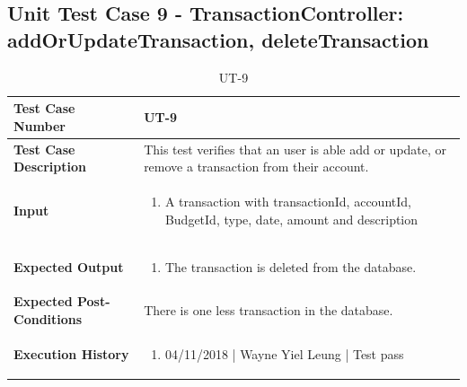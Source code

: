 \documentclass[12pt]{article}
\begin{document}
\subsection{Unit Test Case 9 - TransactionController: addOrUpdateTransaction, deleteTransaction}
\def\arraystretch{1.5}%
\begin{table}[htbp]
\centering
\caption{UT-9}
\label{UT-9}
\begin{tabularx}{\textwidth}{ | l | X |}
\hline
\textbf{Test Case Number}      		&  UT-9                   			\\ \hline
\textbf{Test Case Description}    	&  This test verifies that an user is able add or update, or remove a transaction from their account.                				\\ \hline
\textbf{Input}         			&
\begin{enumerate}
\item A transaction with transactionId, accountId, BudgetId, type, date, amount and description
\end{enumerate} 		\\ \hline
\textbf{Expected Output}     		&
\begin{enumerate}
\item The transaction is deleted from the database.
\end{enumerate} 		\\ \hline
\textbf{Expected Post-Conditions}	& There is one less transaction in the database. \\ \hline
\textbf{Execution History}   		&
\begin{enumerate}
\item 04/11/2018 | Wayne Yiel Leung | Test pass
\end {enumerate} \\ \hline
\end{tabularx}
\end{table}
\clearpage


\end{document}
